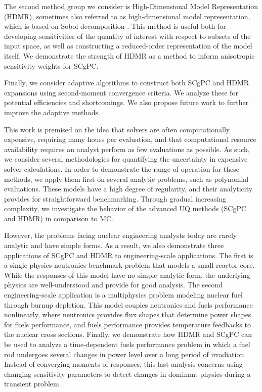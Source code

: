 The second method group we consider is High-Dimensional Model Representation (HDMR), sometimes also referred
to as high-dimensional model representation, which is based on Sobol
decomposition \cite{hdmr}.  This method is useful both for developing sensitivities of the quantity of
interest with respect to subsets
of the input space, as well as constructing a reduced-order representation of the model itself.  We demonstrate the strength of HDMR
as a method to inform anisotropic sensitivity weights for SCgPC.

Finally, we consider adaptive algorithms to construct both SCgPC and HDMR expansions using second-moment
convergence criteria.  We analyze these for potential efficiencies and shortcomings.  We also propose future
work to further improve the adaptive methods.

This work is premised on the idea that solvers are often computationally expensive, requiring many hours per
evaluation, and that
computational resource availability requires an analyst perform as few evaluations as possible.  As such, 
we consider several methodologies for quantifying the uncertainty in expensive solver
calculations.  In order to demonstrate the range of operation for these methods, we apply them first on
several analytic problems, such as polynomial evaluations.  These models have a high
degree of regularity, and their analyticity provides for straightforward benchmarking.  Through gradual
increasing complexity, we investigate the behavior of the advanced UQ methods (SCgPC and HDMR) in comparison to MC.

However, the problems facing nuclear engineering analysts today are rarely analytic and have simple forms.  As
a result, we also demonstrate three applications of SCgPC and HDMR to engineering-scale applications.  The
first is a single-physics neutronics benchmark problem that models a small reactor core.  
While the responses of this model have no simple
analytic form, the underlying physics are well-understood and provide for good analysis.
The second
engineering-scale application is a multiphysics problem modeling nuclear fuel through burnup depletion.  This
model couples neutronics and fuels performance nonlinearly, where neutronics provides flux shapes that
determine power shapes for fuels performance, and fuels performance provides temperature feedbacks to the
nuclear cross sections.
Finally, we demonstrate how HDMR and SCgPC can be used to analyze a time-dependent fuels performance problem
in which a fuel rod undergoes several changes in power level over a long period of irradiation.  Instead of
converging moments of responses, this last analysis concerns using changing sensitivity parameters to detect
changes in dominant physics during a transient problem.

